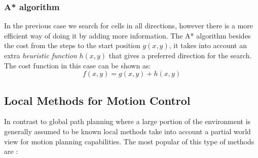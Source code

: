 \subsubsection{A* algorithm}\label{A*}
In the previous case we search for cells in all directions, however there is a more efficient way of doing it by adding more information. The A* algorithm besides the cost from the steps to the start position $g(x,y)$, it takes into account an extra \textit{heuristic function} $h(x, y)$ that gives a preferred direction for the search. 
The cost function in this case can be shown as:
\begin{equation}
    f(x,y)=g(x,y) + h(x,y)
\end{equation}
\subsection{Local Methods for Motion Control }
In contrast to global path planning where a large portion of the environment is generally assumed to be known local methods take into account a partial world view for motion planning capabilities. The most popular of this type of methods are \cite{inbookdwa}:
